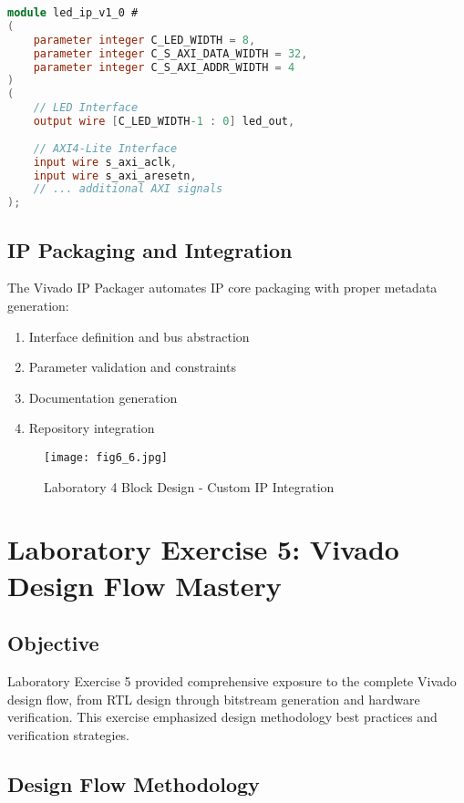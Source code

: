 \documentclass[11pt,a4paper]{article}
\begin{document}
\begin{lstlisting}[language=Verilog, caption=LED IP Top Module Structure]
module led_ip_v1_0 #
(
    parameter integer C_LED_WIDTH = 8,
    parameter integer C_S_AXI_DATA_WIDTH = 32,
    parameter integer C_S_AXI_ADDR_WIDTH = 4
)
(
    // LED Interface
    output wire [C_LED_WIDTH-1 : 0] led_out,
    
    // AXI4-Lite Interface
    input wire s_axi_aclk,
    input wire s_axi_aresetn,
    // ... additional AXI signals
);
\end{lstlisting}

\subsection{IP Packaging and Integration}

The Vivado IP Packager automates IP core packaging with proper metadata generation:

\begin{enumerate}[leftmargin=*]
    \item Interface definition and bus abstraction
    \item Parameter validation and constraints
    \item Documentation generation
    \item Repository integration
\end{enumerate}

\begin{figure}[H]
    \centering
    \texttt{[image: fig6\_6.jpg]}
    \caption{Laboratory 4 Block Design - Custom IP Integration}
    \label{fig:lab4_block}
\end{figure}

\section{Laboratory Exercise 5: Vivado Design Flow Mastery}

\subsection{Objective}
Laboratory Exercise 5 provided comprehensive exposure to the complete Vivado design flow, from RTL design through bitstream generation and hardware verification. This exercise emphasized design methodology best practices and verification strategies.

\subsection{Design Flow Methodology}
\end{document}
